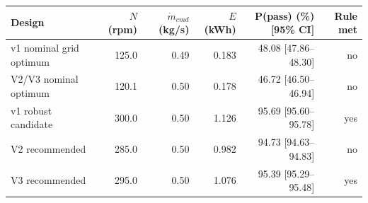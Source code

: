 \begin{tabular}{lrrrrr}
\toprule
Design & $N$ (rpm) & $\dot m_{cmd}$ (kg/s) & $E$ (kWh) & P(pass) (\%) [95\% CI] & Rule met \\
\midrule
v1 nominal grid optimum & 125.0 & 0.49 & 0.183 & 48.08 [47.86--48.30] & no \\
V2/V3 nominal optimum & 120.1 & 0.50 & 0.178 & 46.72 [46.50--46.94] & no \\
v1 robust candidate & 300.0 & 0.50 & 1.126 & 95.69 [95.60--95.78] & yes \\
V2 recommended & 285.0 & 0.50 & 0.982 & 94.73 [94.63--94.83] & no \\
V3 recommended & 295.0 & 0.50 & 1.076 & 95.39 [95.29--95.48] & yes \\
\bottomrule
\end{tabular}
